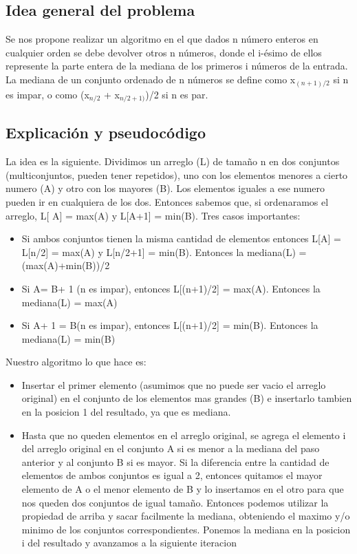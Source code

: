 \subsection{Idea general del problema}
Se nos propone realizar un algoritmo en el que dados n número enteros en cualquier orden se debe devolver otros n números, donde el i-ésimo de ellos represente la parte entera de la mediana de los primeros i números de la entrada.
La mediana de un conjunto ordenado de n números se define como x$_{(n+1)/2}$ si n es impar, o como (x$_{n/2}$ + x$_{n/2+1)}$)/2  si n es par.
\subsection{Explicación y pseudocódigo}

La idea es la siguiente. Dividimos un arreglo (L) de tamaño n en dos conjuntos (multiconjuntos, pueden tener repetidos), uno con los elementos menores a cierto numero (A) y otro con los mayores (B). Los elementos iguales a ese numero pueden ir en cualquiera de los dos. Entonces sabemos que, si ordenaramos el arreglo, L[ \textbar A\textbar] = max(A) y L[\textbar A\textbar+1] = min(B). Tres casos importantes: 

\begin{itemize}
\item Si ambos conjuntos tienen la misma cantidad de elementos entonces L[\textbar A\textbar] = L[n/2] = max(A) y L[n/2+1] = min(B). Entonces la mediana(L) = (max(A)+min(B))/2
\item Si \textbar A\textbar = \textbar B\textbar + 1 (n es impar), entonces L[(n+1)/2] = max(A). Entonces la mediana(L) = max(A)
\item Si \textbar A\textbar + 1 = \textbar B\textbar (n es impar), entonces L[(n+1)/2] = min(B). Entonces la mediana(L) = min(B)
\end{itemize}
	

	
Nuestro algoritmo lo que hace es: 
\begin{itemize}
\item Insertar el primer elemento (asumimos que no puede ser vacio el arreglo original) en el conjunto de los elementos mas grandes (B) e insertarlo tambien en la posicion 1 del resultado, ya que es mediana.
\item Hasta que no queden elementos en el arreglo original, se agrega el elemento i del arreglo original en el conjunto A si es menor a la mediana del paso anterior y al conjunto B si es mayor. Si la diferencia entre la cantidad de elementos de ambos conjuntos es igual a 2, entonces quitamos el mayor elemento de A o el menor elemento de B y lo insertamos en el otro para que nos queden dos conjuntos de igual tamaño. Entonces podemos utilizar la propiedad de arriba y sacar facilmente la mediana, obteniendo el maximo y/o minimo de los conjuntos correspondientes. Ponemos la mediana en la posicion i del resultado y avanzamos a la siguiente iteracion
\end{itemize}


